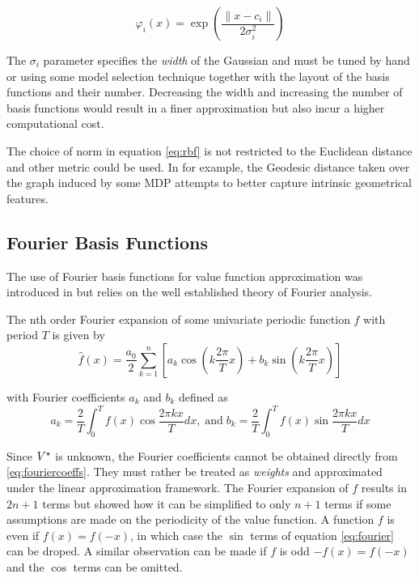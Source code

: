 \begin{equation}
\varphi_i(x) = \exp\left( \frac{\| x - c_i\|}{2\sigma_i^2}\right)
\label{eq:rbf}
\end{equation}

The $\sigma_i$ parameter specifies the \textit{width} of the Gaussian and must be
tuned by hand or using some model selection technique together with the
layout of the basis functions and their number. Decreasing the width and increasing the
number of basis functions would result in a finer approximation but also incur a higher
computational cost. 

The choice of norm in equation \ref{eq:rbf} is not restricted to the Euclidean distance
and other metric could be used. In \cite{Sugiyama2008} for example, the Geodesic
distance taken over the graph induced by some MDP attempts to better
capture intrinsic geometrical features.
 
\subsection{Fourier Basis Functions}

The use of Fourier basis functions for value function approximation was introduced in
\cite{Konidaris2011b} but relies on the well established theory of Fourier analysis.

The nth order Fourier expansion of some univariate periodic function $f$ with period
$T$ is given by
\begin{equation}
\hat{f}(x) = \frac{a_0}{2} \sum_{k=1}^n \left[ a_k \cos\left(k\frac{2\pi}{T} x\right) +
b_k \sin \left(k \frac{2\pi}{T}x \right) \right]
\label{eq:fourier}
\end{equation}

with Fourier coefficients $a_k$ and $b_k$ defined as
\begin{equation}
a_k = \frac{2}{T} \int_0^T f(x) \cos \frac{2\pi kx}{T}dx, \; \mbox{and} \; b_k = \frac{2}
{T} \int_0^T f(x) \sin \frac{2\pi kx}{T}dx
\label{eq:fouriercoeffs}
\end{equation}

Since $V^\star$ is unknown, the Fourier coefficients cannot be obtained directly from \ref{eq:fouriercoeffs}. They must rather be treated as \textit{weights} and approximated under the linear approximation framework. The Fourier expansion of $f$ results in $2n+1$ terms but
\cite{Konidaris2011b} showed how it can be simplified to only $n+1$ terms if some
assumptions are made on the periodicity of the value function. A function $f$ is even if
$f(x) = f(-x)$, in which case the $\sin$ terms of equation \ref{eq:fourier} can be
droped. A similar observation can be made if $f$ is odd $-f(x) = f(-x)$ and the
$\cos$ terms can be omitted. 


